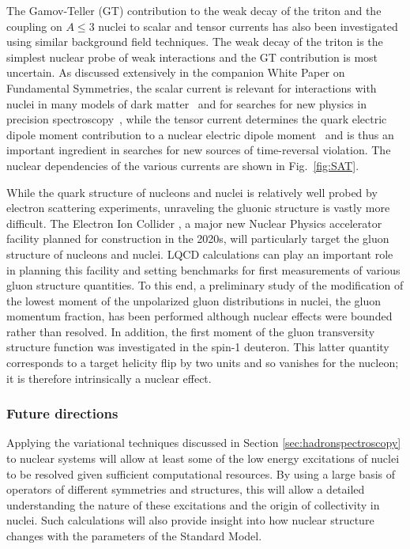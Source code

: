 The Gamov-Teller (GT) contribution to the weak decay of the triton \cite{Savage:2016kon} and the coupling on $A\le3$ nuclei to scalar and tensor currents \cite{Chang:2017eiq} has also been investigated using similar background field techniques. The weak decay of the triton is the simplest nuclear probe of weak interactions and the GT contribution is most uncertain. 
As discussed extensively in the companion White Paper on Fundamental Symmetries, the scalar current is relevant for interactions with nuclei in many models of dark matter~\cite{Undagoitia:2015gya} and for searches for new physics in precision spectroscopy~\cite{Delaunay:2016brc,Delaunay:2017dku}, while the tensor current determines 
the quark electric dipole moment contribution to a nuclear electric dipole moment~\cite{Engel:2013lsa,Yamanaka:2016umw,Chupp:2017rkp} and is thus an important ingredient in searches for new sources of time-reversal violation. 
 The nuclear dependencies of the various currents are shown in Fig.~\ref{fig:SAT}.


While the quark structure of nucleons and nuclei is relatively well probed by electron scattering experiments, unraveling the gluonic structure is vastly more difficult. The Electron Ion Collider \cite{Accardi:2012qut}, a major new Nuclear Physics accelerator facility planned for construction in the 2020s, will particularly target the gluon structure of nucleons and nuclei. LQCD calculations can play an important role in planning this facility and setting benchmarks for first measurements of various gluon structure quantities. To this end, a preliminary study of the modification of the lowest moment of the unpolarized  gluon distributions in nuclei, the gluon momentum fraction, has been performed \cite{Winter:2017bfs}  although nuclear effects were bounded rather than resolved.   In addition, the first moment of the gluon transversity structure function was investigated in the spin-1 deuteron. This latter  quantity  corresponds to a target helicity flip by two units and so vanishes for the nucleon; it is therefore intrinsically a nuclear effect.




\subsubsection{Future directions}

Applying the variational techniques discussed in Section \ref{sec:hadronspectroscopy} to nuclear systems will allow at least some of the low energy excitations of nuclei to be resolved given sufficient computational resources. By using a large basis of operators of different symmetries and structures, this will allow a detailed understanding the nature of these excitations and the origin of collectivity in nuclei. Such calculations will also provide insight into how nuclear structure changes with the parameters of the Standard Model.

